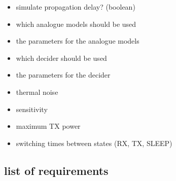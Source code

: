 \begin{itemize}
	\item simulate propagation delay? (boolean)
	\item which analogue models should be used
	\item the parameters for the analogue models
	\item which decider should be used
	\item the parameters for the decider
	\item thermal noise
	\item sensitivity
	\item maximum TX power
	\item switching times between states (RX, TX, SLEEP)
\end{itemize}

\subsection{list of requirements}
\label{requirements}

